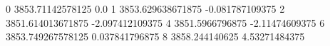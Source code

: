 0 3853.71142578125 0.0
1 3853.629638671875 -0.081787109375
2 3851.614013671875 -2.097412109375
4 3851.5966796875 -2.11474609375
6 3853.749267578125 0.037841796875
8 3858.244140625 4.53271484375
